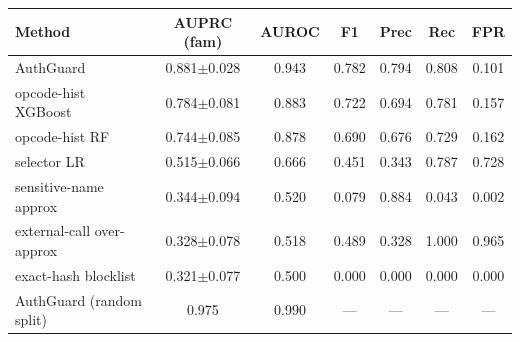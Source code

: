 \begin{tabular}{lcccccc}
\toprule
Method & AUPRC (fam) & AUROC & F1 & Prec & Rec & FPR \\
\midrule
AuthGuard & 0.881$\pm$0.028 & 0.943 & 0.782 & 0.794 & 0.808 & 0.101 \\
opcode-hist XGBoost & 0.784$\pm$0.081 & 0.883 & 0.722 & 0.694 & 0.781 & 0.157 \\
opcode-hist RF & 0.744$\pm$0.085 & 0.878 & 0.690 & 0.676 & 0.729 & 0.162 \\
selector LR & 0.515$\pm$0.066 & 0.666 & 0.451 & 0.343 & 0.787 & 0.728 \\
sensitive-name approx & 0.344$\pm$0.094 & 0.520 & 0.079 & 0.884 & 0.043 & 0.002 \\
external-call over-approx & 0.328$\pm$0.078 & 0.518 & 0.489 & 0.328 & 1.000 & 0.965 \\
exact-hash blocklist & 0.321$\pm$0.077 & 0.500 & 0.000 & 0.000 & 0.000 & 0.000 \\
\midrule
AuthGuard (random split) & 0.975 & 0.990 & --- & --- & --- & --- \\
\bottomrule
\end{tabular}
